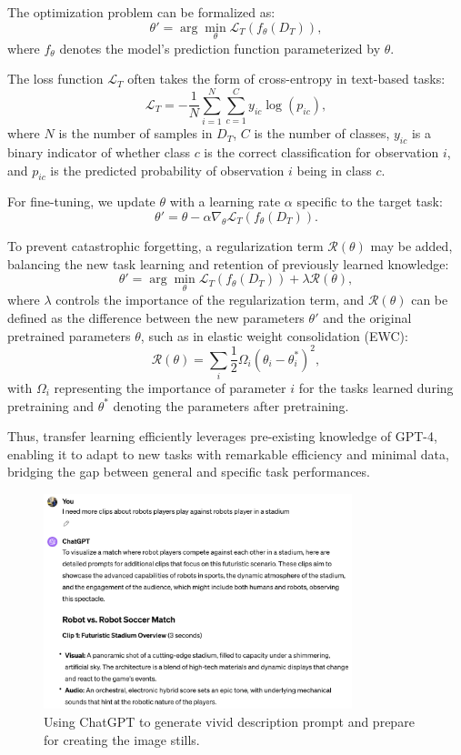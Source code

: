 \documentclass[11pt,a4paper,oneside]{report}
\begin{document}
The optimization problem can be formalized as:
\[
\theta' = \arg\min_{\theta} \mathcal{L}_{T}(f_{\theta}(D_{T})),
\]
where \(f_{\theta}\) denotes the model's prediction function parameterized by \(\theta\).

The loss function \(\mathcal{L}_{T}\) often takes the form of cross-entropy in text-based tasks:
\[
\mathcal{L}_{T} = -\frac{1}{N}\sum_{i=1}^{N}\sum_{c=1}^{C} y_{ic}\log(p_{ic}),
\]
where \(N\) is the number of samples in \(D_{T}\), \(C\) is the number of classes, \(y_{ic}\) is a binary indicator of whether class \(c\) is the correct classification for observation \(i\), and \(p_{ic}\) is the predicted probability of observation \(i\) being in class \(c\).

For fine-tuning, we update \(\theta\) with a learning rate \(\alpha\) specific to the target task:
\[
\theta' = \theta - \alpha \nabla_{\theta} \mathcal{L}_{T}(f_{\theta}(D_{T})).
\]

To prevent catastrophic forgetting, a regularization term \(\mathcal{R}(\theta)\) may be added, balancing the new task learning and retention of previously learned knowledge:
\[
\theta' = \arg\min_{\theta} \mathcal{L}_{T}(f_{\theta}(D_{T})) + \lambda \mathcal{R}(\theta),
\]
where \(\lambda\) controls the importance of the regularization term, and \(\mathcal{R}(\theta)\) can be defined as the difference between the new parameters \(\theta'\) and the original pretrained parameters \(\theta\), such as in elastic weight consolidation (EWC):
\[
\mathcal{R}(\theta) = \sum_{i} \frac{1}{2} \Omega_{i} (\theta_{i} - \theta_{i}^{*})^2,
\]
with \(\Omega_{i}\) representing the importance of parameter \(i\) for the tasks learned during pretraining and \(\theta^{*}\) denoting the parameters after pretraining.

Thus, transfer learning efficiently leverages pre-existing knowledge of GPT-4, enabling it to adapt to new tasks with remarkable efficiency and minimal data, bridging the gap between general and specific task performances.

\begin{figure}[htbp]
  \centering
  \includegraphics[width=0.8\textwidth]{ChatGPT.png}
  \caption{Using ChatGPT to generate vivid description prompt and prepare for creating the image stills.}
\end{figure}
\end{document}
